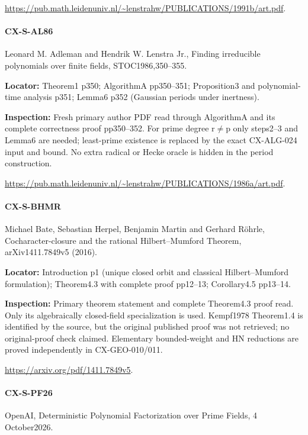 \documentclass[11pt,a4paper]{article}
\begin{document}
\url{https://pub.math.leidenuniv.nl/~lenstrahw/PUBLICATIONS/1991b/art.pdf}.

\paragraph{CX-S-AL86} Leonard M.\allowbreak{} Adleman and Hendrik W.\allowbreak{} Lenstra Jr.\allowbreak{}, Finding irreducible polynomials over finite fields, STOC1986,350–\allowbreak{}355.

\textbf{Locator:} Theorem1 p350; AlgorithmA pp350–\allowbreak{}351; Proposition3 and polynomial-time analysis p351; Lemma6 p352 (Gaussian periods under inertness).

\textbf{Inspection:} Fresh primary author PDF read through AlgorithmA and its complete correctness proof pp350–\allowbreak{}352.\allowbreak{} For prime degree r\ensuremath{\ne}p only steps2–\allowbreak{}3 and Lemma6 are needed; least-prime existence is replaced by the exact CX-ALG-024 input and bound.\allowbreak{} No extra radical or Hecke oracle is hidden in the period construction.\allowbreak{}

\url{https://pub.math.leidenuniv.nl/~lenstrahw/PUBLICATIONS/1986a/art.pdf}.

\paragraph{CX-S-BHMR} Michael Bate, Sebastian Herpel, Benjamin Martin and Gerhard Röhrle, Cocharacter-closure and the rational Hilbert–\allowbreak{}Mumford Theorem, arXiv1411.\allowbreak{}7849v5 (2016).

\textbf{Locator:} Introduction p1 (unique closed orbit and classical Hilbert–\allowbreak{}Mumford formulation); Theorem4.\allowbreak{}3 with complete proof pp12–\allowbreak{}13; Corollary4.\allowbreak{}5 pp13–\allowbreak{}14.

\textbf{Inspection:} Primary theorem statement and complete Theorem4.\allowbreak{}3 proof read.\allowbreak{} Only its algebraically closed-field specialization is used.\allowbreak{} Kempf1978 Theorem1.\allowbreak{}4 is identified by the source, but the original published proof was not retrieved; no original-proof check claimed.\allowbreak{} Elementary bounded-weight and HN reductions are proved independently in CX-GEO-010/\allowbreak{}011.\allowbreak{}

\url{https://arxiv.org/pdf/1411.7849v5}.

\paragraph{CX-S-PF26} OpenAI, Deterministic Polynomial Factorization over Prime Fields, 4 October2026.
\end{document}
